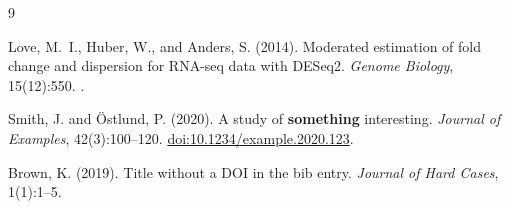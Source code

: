 \documentclass{article}
\begin{document}

\begin{thebibliography}{9}

Love, M.~I., Huber, W., and Anders, S. (2014).
\newblock Moderated estimation of fold change and dispersion for RNA-seq data with DESeq2.
\newblock \emph{Genome Biology}, 15(12):550.
\newblock {}.

Smith, J. and \"Ostlund, P. (2020).
\newblock A study of \textbf{something} interesting.
\newblock \textit{Journal of Examples}, 42(3):100--120.
\newblock \href{https://doi.org/10.1234/example.2020.123}{doi:10.1234/example.2020.123}.

Brown, K. (2019).
\newblock Title without a DOI in the bib entry.
\newblock \emph{Journal of Hard Cases}, 1(1):1--5.

\end{thebibliography}
\end{document}
